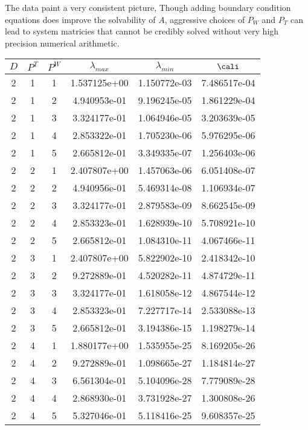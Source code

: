 \documentclass{article}
\begin{document}
{The data paint a very consistent picture,   Though adding boundary
condition equations does improve the solvability of $A$, aggressive
choices of $P_W$ and $P_T$ can lead to system matricies that cannot be
credibly solved without very high precision numerical arithmetic.
\begin{small}
\begin{table}
\begin{center}
\begin{tabular}{|ccc|ccc|} \hline
 $D$ & $P^T$  & $P^W$  & $\lambda_{max}$ & $\lambda_{min}$   & $\cali$ \\
 \hline
2 & 1 & 1 &  1.537125e+00 & 1.150772e-03 & 7.486517e-04 \\
2 & 1 & 2 &  4.940953e-01 & 9.196245e-05 & 1.861229e-04 \\
2 & 1 & 3 &  3.324177e-01 & 1.064946e-05 & 3.203639e-05 \\
2 & 1 & 4 &  2.853322e-01 & 1.705230e-06 & 5.976295e-06 \\
2 & 1 & 5 &  2.665812e-01 & 3.349335e-07 & 1.256403e-06 \\
2 & 2 & 1 &  2.407807e+00 & 1.457063e-06 & 6.051408e-07 \\
2 & 2 & 2 &  4.940956e-01 & 5.469314e-08 & 1.106934e-07 \\
2 & 2 & 3 &  3.324177e-01 & 2.879583e-09 & 8.662545e-09 \\
2 & 2 & 4 &  2.853323e-01 & 1.628939e-10 & 5.708921e-10 \\
2 & 2 & 5 &  2.665812e-01 & 1.084310e-11 & 4.067466e-11 \\
2 & 3 & 1 &  2.407807e+00 & 5.822902e-10 & 2.418342e-10 \\
2 & 3 & 2 &  9.272889e-01 & 4.520282e-11 & 4.874729e-11 \\ 
2 & 3 & 3 &  3.324177e-01 & 1.618058e-12 & 4.867544e-12 \\
2 & 3 & 4 &  2.853323e-01 & 7.227717e-14 & 2.533088e-13 \\
2 & 3 & 5 &  2.665812e-01 & 3.194386e-15 & 1.198279e-14 \\
2 & 4 & 1 &  1.880177e+00 & 1.535955e-25 & 8.169205e-26 \\
2 & 4 & 2 &  9.272889e-01 & 1.098665e-27 & 1.184814e-27 \\
2 & 4 & 3 &  6.561304e-01 & 5.104096e-28 & 7.779089e-28 \\
2 & 4 & 4 &  2.868930e-01 & 3.731928e-27 & 1.300808e-26 \\
2 & 4 & 5 &  5.327046e-01 & 5.118416e-25 & 9.608357e-25 \\

\end{tabular}
\end{center}
\end{table}
\end{small}}
\end{document}
